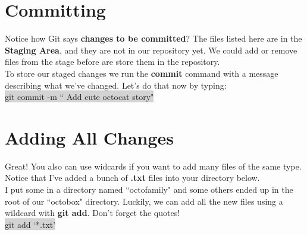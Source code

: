 \documentclass{article}
\begin{document}
\section{Committing}
\begin{minipage}[c]{0.66\textwidth}
	\parbox{\textwidth}{
		Notice how Git says \textbf{ changes to be committed}? The files listed here are in the \textbf{Staging Area}, and they are not in our repository yet. We could add or remove files from the stage before are store them in the repository.\\
		To store our staged changes we run the \textbf{commit} command with a message describing what we've changed. Let's do that now by typing:\\
		\colorbox{lightgray}{ git commit -m `` Add cute octocat story"}\\
	}
\end{minipage}
\hfill
\begin{minipage}[c]{0.32\textwidth}
\end{minipage}

\section{Adding All Changes}
\begin{minipage}[c]{0.66\textwidth}
	\parbox{\textwidth}{
		Great! You also can use widcards if you want to add many files of the same type. Notice that I've added a bunch of \textbf{.txt} files into your directory below.\\
		I put some in a directory named ``octofamily" and some others ended up in the root of our ``octobox" directory. Luckily, we can add all the new files using a wildcard with \textbf{git add}. Don't forget the quotes!\\
		\colorbox{lightgray}{ git add `*.txt'}
	}
\end{minipage}
\hfill
\begin{minipage}[c]{0.32\textwidth}
\end{minipage}
\end{document}
